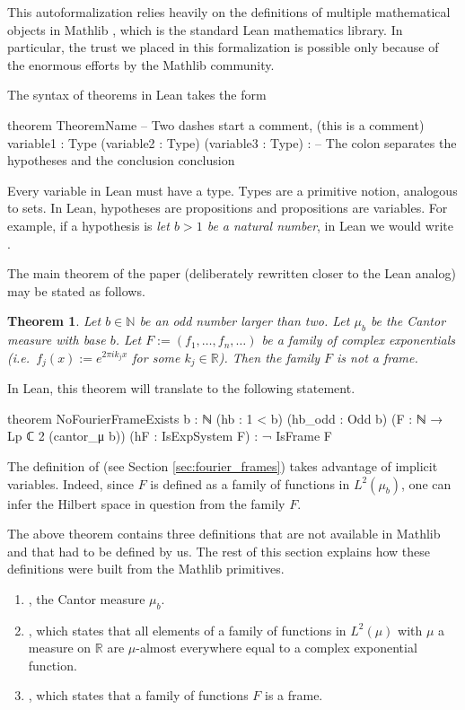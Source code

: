 \documentclass[reqno,a4paper,12pt]{amsart}
\newtheorem*{theorem*}{Theorem}
\def\R{{\mathbb R}}
\begin{document}
This autoformalization relies heavily on the definitions of multiple mathematical objects in Mathlib \cite{mathlib}, which is the standard Lean mathematics library. In particular, the trust we placed in this formalization is possible only because of the enormous efforts by the Mathlib community.

The syntax of theorems in Lean takes the form
\begin{leancode}
theorem TheoremName -- Two dashes start a comment, (this is a comment)
    {variable1 : Type} (variable2 : Type) (variable3 : Type) : 
    -- The colon separates the hypotheses and the conclusion
    conclusion
\end{leancode}
Every variable in Lean must have a type. Types are a primitive notion, analogous to sets. In Lean, hypotheses are propositions and propositions are variables. For example, if a hypothesis is \emph{let $b>1$ be a natural number}, in Lean we would write .

The main theorem of the paper (deliberately rewritten closer to the Lean analog) may be stated as follows.

\begin{theorem*}
    Let $b\in \mathbb N$ be an odd number larger than two. Let $\mu_b$ be the Cantor measure with base $b$.
    Let $F:= (f_1, \dots, f_n, \dots)$ be a family of complex exponentials (i.e.~$f_j(x) := e^{2\pi i k_j x}$ for some $k_j \in \R$). Then the family $F$ is not a frame. 
\end{theorem*}
In Lean, this theorem will translate to the following statement.
\begin{leancode}
theorem NoFourierFrameExists
    {b : ℕ} (hb : 1 < b) (hb_odd : Odd b)
    (F : ℕ → Lp ℂ 2 (cantor_μ b)) (hF : IsExpSystem F) :
    ¬ IsFrame F
\end{leancode}
The definition of  (see Section \ref{sec:fourier_frames}) takes advantage of implicit variables. Indeed, since $F$ is defined as a family of functions in $L^2(\mu_b)$, one can infer the Hilbert space in question from the family $F$.

The above theorem contains three definitions that are not available in Mathlib and that had to be defined by us. 
The rest of this section explains how these definitions were built from the Mathlib primitives.

\begin{enumerate}
    \item {}, the Cantor measure $\mu_b$.
    \item {}, which states that all elements of a family of functions in $L^2(\mu)$ with $\mu$ a measure on $\R$ are $\mu$-almost everywhere equal to a complex exponential function.
    \item {}, which states that a family of functions $F$ is a frame. 
\end{enumerate}
\end{document}
